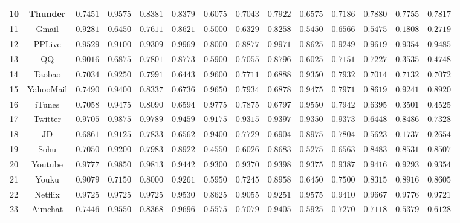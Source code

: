\documentclass[degree=master,cjk-font=noto]{thuthesis}
\begin{document}
\begin{table}[!htp]
\begin{center}
\begin{tabular}{c|c|c c c|c c c|c c c|c c c}
			10 & Thunder & $0.7451$ & $0.9575$ & $0.8381$ & $0.8379$ & $0.6075$ & $0.7043$ & $0.7922$ & $0.6575$ & $0.7186$ & $0.7880$ & $0.7755$ & $0.7817$  \\\hline
			11 & Gmail & $0.9281$ & $0.6450$ & $0.7611$ & $0.8621$ & $0.5000$ & $0.6329$ & $0.8258$ & $0.5450$ & $0.6566$ & $0.5475$ & $0.1808$ & $0.2719$  \\\hline
			12 & PPLive & $0.9529$ & $0.9100$ & $0.9309$ & $0.9969$ & $0.8000$ & $0.8877$ & $0.9971$ & $0.8625$ & $0.9249$ & $0.9619$ & $0.9354$ & $0.9485$  \\\hline
			13 & QQ & $0.9016$ & $0.6875$ & $0.7801$ & $0.8773$ & $0.5900$ & $0.7055$ & $0.8796$ & $0.6025$ & $0.7151$ & $0.7227$ & $0.3535$ & $0.4748$  \\\hline
			14 & Taobao & $0.7034$ & $0.9250$ & $0.7991$ & $0.6443$ & $0.9600$ & $0.7711$ & $0.6888$ & $0.9350$ & $0.7932$ & $0.7014$ & $0.7132$ & $0.7072$  \\\hline
			15 & YahooMail & $0.7490$ & $0.9400$ & $0.8337$ & $0.6736$ & $0.9650$ & $0.7934$ & $0.6878$ & $0.9475$ & $0.7971$ & $0.8619$ & $0.9241$ & $0.8920$ \\\hline
			16 & iTunes & $0.7058$ & $0.9475$ & $0.8090$ & $0.6594$ & $0.9775$ & $0.7875$ & $0.6797$ & $0.9550$ & $0.7942$ & $0.6395$ & $0.3501$ & $0.4525$  \\\hline
			17 & Twitter & $0.9705$ & $0.9875$ & $0.9789$ & $0.9459$ & $0.9175$ & $0.9315$ & $0.9397$ & $0.9350$ & $0.9373$ & $0.6448$ & $0.8486$ & $0.7328$  \\\hline
			18 & JD & $0.6861$ & $0.9125$ & $0.7833$ & $0.6562$ & $0.9400$ & $0.7729$ & $0.6904$ & $0.8975$ & $0.7804$ & $0.5623$ & $0.1737$ & $0.2654$  \\\hline
			19 & Sohu & $0.7050$ & $0.9200$ & $0.7983$ & $0.8922$ & $0.4550$ & $0.6026$ & $0.8683$ & $0.5275$ & $0.6563$ & $0.8483$ & $0.8531$ & $0.8507$  \\\hline
			20 & Youtube & $0.9777$ & $0.9850$ & $0.9813$ & $0.9442$ & $0.9300$ & $0.9370$ & $0.9398$ & $0.9375$ & $0.9387$ & $0.9416$ & $0.9293$ & $0.9354$  \\\hline
			21 & Youku & $0.9079$ & $0.7150$ & $0.8000$ & $0.9261$ & $0.5950$ & $0.7245$ & $0.8958$ & $0.6450$ & $0.7500$ & $0.8315$ & $0.8916$ & $0.8605$  \\\hline
			22 & Netflix & $0.9725$ & $0.9725$ & $0.9725$ & $0.9530$ & $0.8625$ & $0.9055$ & $0.9251$ & $0.9575$ & $0.9410$ & $0.9667$ & $0.9776$ & $0.9721$  \\\hline
			23 & Aimchat & $0.7446$ & $0.9550$ & $0.8368$ & $0.9696$ & $0.5575$ & $0.7079$ & $0.9405$ & $0.5925$ & $0.7270$ & $0.7118$ & $0.5379$ & $0.6128$  \\\hline

\end{tabular}
\end{center}
\end{table}
\end{document}
